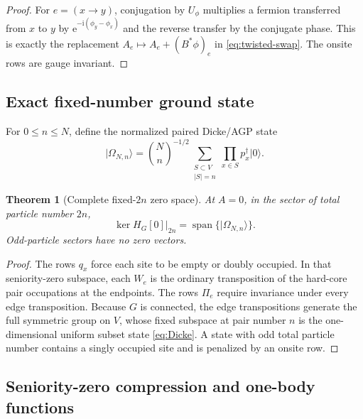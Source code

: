 \documentclass[11pt]{article}
\newtheorem{theorem}{Theorem}[section]
\theoremstyle{definition}
\theoremstyle{remark}
\newcommand{\Span}{\operatorname{span}}
\newcommand{\I}{\mathrm i}
\newcommand{\e}{\mathrm e}
\newcommand{\ket}[1]{\lvert #1\rangle}
\newcommand{\abs}[1]{\lvert #1\rvert}
\begin{document}
\begin{proof}
For $e=(x\to y)$, conjugation by $U_\phi$ multiplies a fermion transferred from $x$ to $y$ by
$\e^{-\I(\phi_y-\phi_x)}$ and the reverse transfer by the conjugate phase.  This is exactly the replacement
$A_e\mapsto A_e+(B^*\phi)_e$ in \eqref{eq:twisted-swap}.  The onsite rows are gauge invariant.
\end{proof}

\subsection{Exact fixed-number ground state}

For $0\le n\le N$, define the normalized paired Dicke/AGP state
\begin{equation}
 \ket{\Omega_{N,n}}
 =\binom Nn^{-1/2}
 \sum_{\substack{S\subset V\\\abs S=n}}
 \prod_{x\in S}p_x^\dagger\ket0.
 \label{eq:Dicke}
\end{equation}

\begin{theorem}[Complete fixed-$2n$ zero space]
\label{thm:kernel}
At $A=0$, in the sector of total particle number $2n$,
\begin{equation}
 \ker H_G[0]\big|_{2n}=\Span\{\ket{\Omega_{N,n}}\}.
 \label{eq:kernel}
\end{equation}
Odd-particle sectors have no zero vectors.
\end{theorem}

\begin{proof}
The rows $q_x$ force each site to be empty or doubly occupied.  In that seniority-zero subspace, each
$W_e$ is the ordinary transposition of the hard-core pair occupations at the endpoints.  The rows
$\Pi_e$ require invariance under every edge transposition.  Because $G$ is connected, the edge
transpositions generate the full symmetric group on $V$, whose fixed subspace at pair number $n$ is the
one-dimensional uniform subset state \eqref{eq:Dicke}.  A state with odd total particle number contains
a singly occupied site and is penalized by an onsite row.
\end{proof}

\subsection{Seniority-zero compression and one-body functions}
\end{document}
